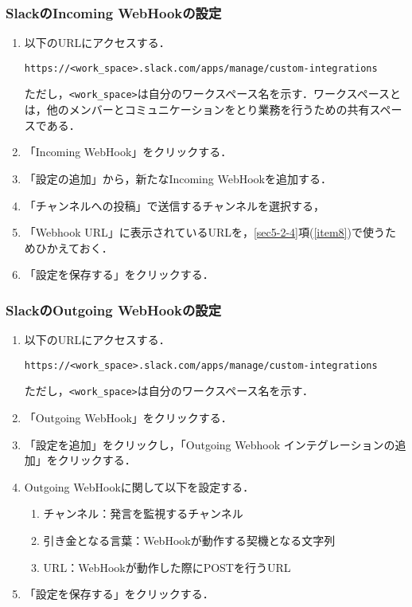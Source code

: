 \documentclass[12pt]{jsarticle}
\begin{document}
\subsubsection{SlackのIncoming WebHookの設定}\label{sec:IW}
\begin{enumerate}
\item 以下のURLにアクセスする．
\begin{verbatim}
https://<work_space>.slack.com/apps/manage/custom-integrations
\end{verbatim}
ただし，\verb|<work_space>|は自分のワークスペース名を示す．ワークスペースとは，他のメンバーとコミュニケーションをとり業務を行うための共有スペースである．
\item 「Incoming WebHook」をクリックする．
\item 「設定の追加」から，新たなIncoming WebHookを追加する．
\item 「チャンネルへの投稿」で送信するチャンネルを選択する，
\item 「Webhook URL」に表示されているURLを，\ref{sec5-2-4}項(\ref{item8})で使うためひかえておく．\label{url}
\item 「設定を保存する」をクリックする．
\end{enumerate}

\subsubsection{SlackのOutgoing WebHookの設定}
\begin{enumerate}
\item 以下のURLにアクセスする．
\begin{verbatim}
https://<work_space>.slack.com/apps/manage/custom-integrations
\end{verbatim}
ただし，\verb|<work_space>|は自分のワークスペース名を示す．
\item 「Outgoing WebHook」をクリックする．
\item 「設定を追加」をクリックし，「Outgoing Webhook インテグレーションの追加」をクリックする．
\item Outgoing WebHookに関して以下を設定する．
  \begin{enumerate}
  \item チャンネル：発言を監視するチャンネル
  \item 引き金となる言葉：WebHookが動作する契機となる文字列
  \item URL：WebHookが動作した際にPOSTを行うURL
  \end{enumerate}
\item 「設定を保存する」をクリックする．
\end{enumerate}
\end{document}
